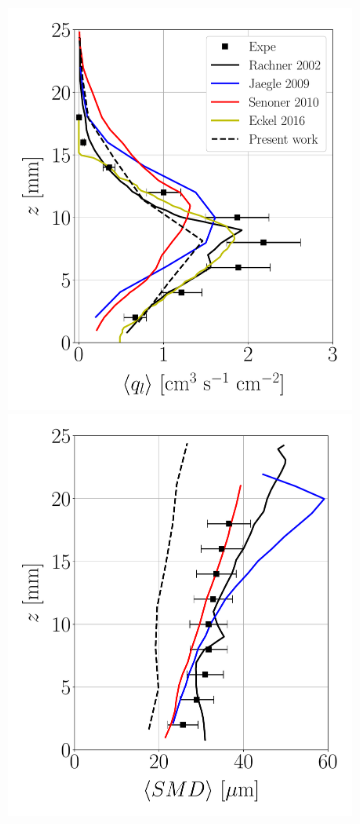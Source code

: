 \begin{figure}[h!]
\flushleft
\begin{subfigure}[b]{0.9\textwidth}
	\centering
   \includegraphics[scale=0.22]{./part2_developments/figures_ch6_lagrangian_JICF/previous_numerical_results/flux_profiles_along_z}
   \includegraphics[scale=0.22]{./part2_developments/figures_ch6_lagrangian_JICF/previous_numerical_results/SMD_profiles_along_z}

\end{subfigure}
\end{figure}
